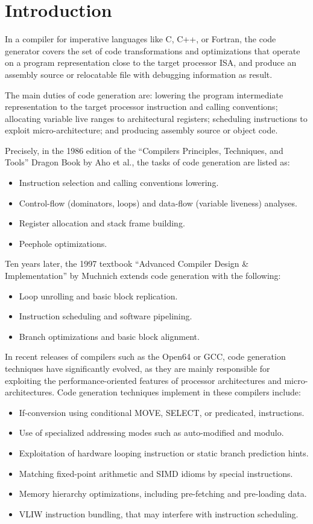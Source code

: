 \chapter{Introduction }
\label{chap:ssa-codegen}

In a compiler for imperative languages like C, C++, or Fortran, the code
generator covers the set of code transformations and optimizations that operate
on a program representation close to the target processor ISA, and produce an
assembly source or relocatable file with debugging information as result.

The main duties of code generation are: lowering the program intermediate
representation to the target processor instruction and calling conventions;
allocating variable live ranges to architectural registers; scheduling
instructions to exploit micro-architecture; and producing assembly source or
object code.

Precisely, in the 1986 edition of
the ``Compilers Principles, Techniques, and Tools'' Dragon Book by Aho et al.,
the tasks of code generation are listed as:
\begin{itemize}
\item Instruction selection and calling conventions lowering.
\item Control-flow (dominators, loops) and data-flow (variable liveness) analyses.
\item Register allocation and stack frame building.
\item Peephole optimizations.
\end{itemize}
Ten years later, the 1997 textbook ``Advanced Compiler Design \& Implementation''
by Muchnich extends code generation with the following: \begin{itemize}
\item Loop unrolling and basic block replication.
\item Instruction scheduling and software pipelining.
\item Branch optimizations and basic block alignment.
\end{itemize}
In recent releases of compilers such as the Open64 or GCC, code generation
techniques have significantly evolved, as they are mainly responsible for
exploiting the performance-oriented features of processor architectures and
micro-architectures. Code generation techniques implement in these compilers
include: \begin{itemize}
\item If-conversion using conditional MOVE, SELECT, or predicated, instructions.
\item Use of specialized addressing modes such as auto-modified and modulo.
\item Exploitation of hardware looping instruction or static branch prediction
hints.
\item Matching fixed-point arithmetic and SIMD idioms by special instructions.
\item Memory hierarchy optimizations, including pre-fetching and pre-loading
data.
\item VLIW instruction bundling, that may interfere with instruction
scheduling.
\end{itemize}

